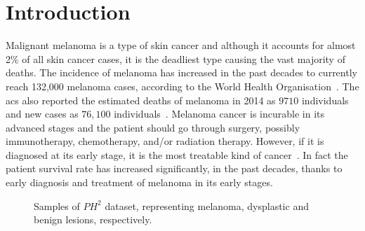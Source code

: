 \graphicspath{ {./content/intro/figures/} }

\section{Introduction}
\label{sec:descr}  %
Malignant melanoma is a type of skin cancer and although it accounts for almost 2\% of all skin cancer cases, it is the deadliest type causing the vast majority of deaths. 
The incidence of melanoma has increased in the past decades to currently reach 132,000 melanoma cases, according to the World Health Organisation~\cite{WoH}.
The \Ac{acs} also reported the estimated deaths of melanoma in 2014 as $9710$ individuals and new cases as $76,100$ individuals~\cite{CancerFactsFigures2014}. 
Melanoma cancer is incurable in its advanced stages and the patient should go through surgery, possibly immunotherapy, chemotherapy, and/or radiation therapy. 
However, if it is diagnosed at its early stage, it is the most treatable kind of cancer~\cite{CancerFactsFigures2014,forsea2012melanoma}.
In fact the patient survival rate has increased significantly, in the past decades, thanks to early diagnosis and treatment of melanoma in its early stages. 

\begin{figure}
\begin{center}
  \hspace*{\fill}
  \hfill
  \hfill
  \hspace*{\fill}
  \caption{Samples of $PH^2$ dataset, representing melanoma, dysplastic and benign lesions, respectively.}
  \label{fig:PH2samples}
\end{center}
\end{figure}

